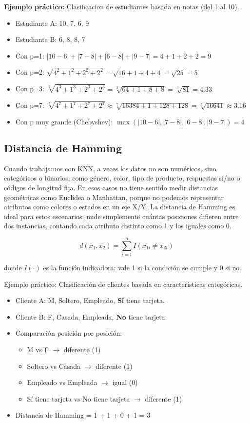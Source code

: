 \documentclass[12pt]{article}
\begin{document}
\textbf{Ejemplo práctico:} Clasificacion de estudiantes basada en notas (del 1 al 10).
\begin{itemize}
    \item Estudiante A: 10, 7, 6, 9
    \item Estudiante B: 6, 8, 8, 7
    \item Con p=1: $|10-6| + |7-8| + |6-8| + |9-7| = 4 + 1 + 2 + 2 = 9$
    \item Con p=2: $\sqrt{4^2 + 1^2 + 2^2 + 2^2} = \sqrt{16 + 1 + 4 + 4} = \sqrt{25} = 5$
    \item Con p=3: $\sqrt[3]{4^3 + 1^3 + 2^3 + 2^3} = \sqrt[3]{64 + 1 + 8 + 8} = \sqrt[3]{81} = 4.33$
    \item Con p=7: $\sqrt[7]{4^{7} + 1^{7} + 2^{7} + 2^{7}} \approx \sqrt[7]{16384 + 1 + 128 + 128} = \sqrt[7]{16641} \approx 3.16$
    \item Con p muy grande (Chebyshev): $\max(|10-6|, |7-8|, |6-8|, |9-7|) = 4$
\end{itemize}

\subsection{Distancia de Hamming}

Cuando trabajamos con KNN, a veces los datos no son numéricos, sino categóricos o binarios, como género, color, tipo de producto, respuestas sí/no o códigos de longitud fija. En esos casos no tiene sentido medir distancias geométricas como Euclídea o Manhattan, porque no podemos representar atributos como colores o estados en un eje X/Y. La distancia de Hamming es ideal para estos escenarios: mide simplemente cuántas posiciones difieren entre dos instancias, contando cada atributo distinto como 1 y los iguales como 0.

\[
d(x_1, x_2) = \sum_{i=1}^{n} I(x_{1i} \neq x_{2i})
\]

donde \(I(\cdot)\) es la función indicadora: vale 1 si la condición se cumple y 0 si no.

Ejemplo práctico: Clasificación de clientes basada en características categóricas.
\begin{itemize}
    \item Cliente A: M, Soltero, Empleado, \textbf{Sí} tiene tarjeta.
    \item Cliente B: F, Casada, Empleada, \textbf{No} tiene tarjeta.
    \item Comparación posición por posición:
    \begin{itemize}
        \item M vs F $\rightarrow$ diferente (1)
        \item Soltero vs Casada $\rightarrow$ diferente (1)
        \item Empleado vs Empleada $\rightarrow$ igual (0)
        \item Sí tiene tarjeta vs No tiene tarjeta $\rightarrow$ diferente (1)
    \end{itemize}
    \item Distancia de Hamming = 1 + 1 + 0 + 1 = 3
\end{itemize}
\end{document}
